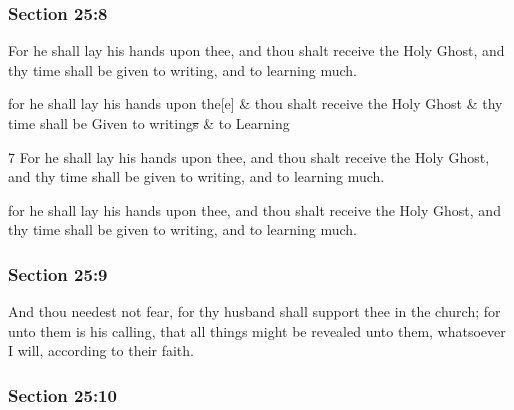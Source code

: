 	\subsubsection{Section 25:8} %
		\label{DC25-8}

		For he shall lay his hands upon thee, and thou shalt receive the Holy Ghost, and thy time shall be given to writing, and to learning much.

		\begin{framed}
		\scriptsize
			\begin{compactdesc}
				\item[JSP] for he shall lay his hands upon the[e] \& thou shalt receive the Holy Ghost \& thy time shall be Given to writing\sout{s} \& to Learning
				\item[BC] 7 For he shall lay his hands upon thee, and thou shalt receive the Holy Ghost, and thy time shall be given to writing, and to learning much.
				\item[DC 1835] for he shall lay his hands upon thee, and thou shalt receive the Holy Ghost, and thy time shall be given to writing, and to learning much.
			\end{compactdesc}
		\end{framed}

	\subsubsection{Section 25:9} %
		\label{DC25-9}

		And thou needest not fear, for thy husband shall support thee in the church; for unto them is his calling, that all things might be revealed unto them, whatsoever I will, according to their faith.


	\subsubsection{Section 25:10} %
		\label{DC25-10}

